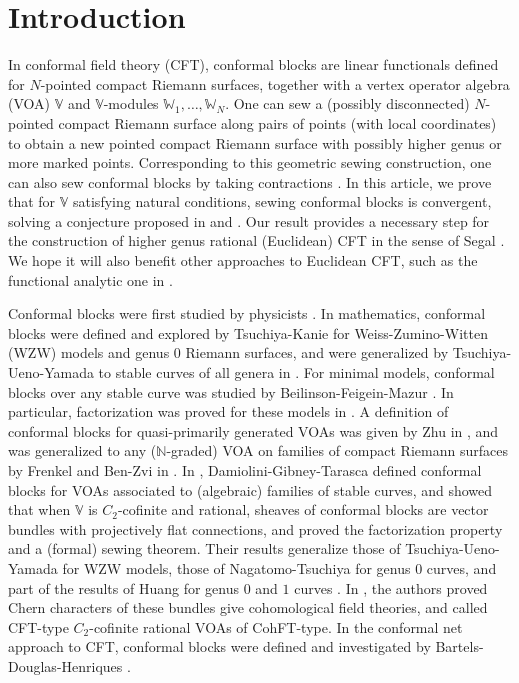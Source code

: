 \documentclass[12pt,a4paper,notitlepage]{article}
\theoremstyle{definition}
\theoremstyle{plain}
\newcommand{\Vbb}{\mathbb V}
\newcommand{\Wbb}{\mathbb W}
\newcommand{\Nbb}{\mathbb N}
\numberwithin{equation}{section}
\begin{document}
\section*{Introduction}


In conformal field theory (CFT), conformal blocks are linear functionals defined for $N$-pointed compact Riemann surfaces, together with a vertex operator algebra (VOA) $\Vbb$ and $\Vbb$-modules $\Wbb_1,\dots,\Wbb_N$. One can sew a (possibly disconnected) $N$-pointed compact Riemann surface along pairs of points (with local coordinates) to obtain a new pointed compact Riemann surface with possibly higher genus or more marked points. Corresponding to this geometric sewing construction, one can also sew conformal blocks by taking contractions \cite{Seg88,Vafa87,TK88,TUY89,BFM91,Zhu94,Hua97,Hua05a,Hua05b,NT05,Hua16,DGT19b}. In this article, we prove that for $\Vbb$ satisfying natural conditions,  sewing conformal blocks is convergent, solving a conjecture  proposed in \cite[Conj. 8.1]{Zhu94} and \cite[Problem 2.2]{Hua16}. Our result provides a necessary step for the construction of higher genus rational (Euclidean) CFT in the sense of Segal \cite{Seg88}. We hope it will also benefit other approaches to Euclidean CFT, such as the functional analytic one in \cite{Ten17,Ten19a,Ten19b,Ten19c}.


Conformal blocks were first studied by physicists \cite{BPZ84,FS87,MS89}. In mathematics, conformal blocks were defined and explored by Tsuchiya-Kanie \cite{TK88} for  Weiss-Zumino-Witten (WZW) models and genus $0$ Riemann surfaces, and were generalized by Tsuchiya-Ueno-Yamada to stable curves of all genera in \cite{TUY89}. For minimal models, conformal blocks over any stable curve was studied by  Beilinson-Feigein-Mazur \cite{BFM91}. In particular, factorization was proved for these models in \cite{TUY89,BFM91}.   A definition of conformal blocks for quasi-primarily generated VOAs was given by Zhu in \cite{Zhu94}, and was generalized to any ($\Nbb$-graded) VOA on families of compact Riemann surfaces by Frenkel and Ben-Zvi in \cite{FB04}. In \cite{DGT19a,DGT19b}, Damiolini-Gibney-Tarasca defined conformal blocks for VOAs associated to (algebraic) families of stable curves, and showed that when $\Vbb$ is $C_2$-cofinite and rational,  sheaves of conformal blocks are vector bundles with projectively flat connections, and proved the factorization property and a (formal) sewing theorem. Their results generalize those of Tsuchiya-Ueno-Yamada \cite{TUY89} for WZW models, those of Nagatomo-Tsuchiya \cite{NT05} for genus $0$ curves, and part of the results of Huang for genus $0$ and $1$ curves \cite{Hua95,Hua05a,Hua05b}. In \cite{DGT19c}, the authors proved Chern characters of these bundles give cohomological field theories, and called CFT-type $C_2$-cofinite rational VOAs of CohFT-type. In the conformal net approach to CFT, conformal blocks were defined and investigated by Bartels-Douglas-Henriques \cite{BDH17}.
\end{document}
